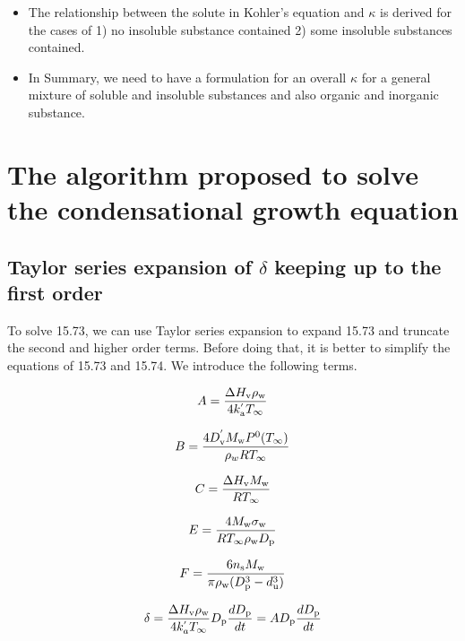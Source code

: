 \documentclass[12pt]{article}
\begin{document}
{\begin{itemize}
\item The relationship between the solute in Kohler's equation and $\kappa$ is derived for the cases of 1) no insoluble substance contained 2) some insoluble substances contained.  

\item In Summary, we need to have a formulation for an overall $\kappa$ for a general mixture of soluble and insoluble substances and also organic and inorganic substance. 
 
\end{itemize}

\section{The algorithm proposed to solve the condensational growth equation}
\subsection{Taylor series expansion of $\delta$ keeping up to the first order}

To solve 15.73, we can use Taylor series expansion to expand 15.73 and truncate the second and higher order terms. Before doing that, it is better to simplify the equations of 15.73 and 15.74. We introduce the following terms.

\begin{equation}
A=\frac{\Delta H_{\rm v} \rho_{\rm w}}{4 k_{\rm a}^{'} T_{\infty}}
\end{equation}

\begin{equation}
B=\frac{4 D_{\rm v}^{'} M_{\rm w} P^{\rm 0}(T_{\infty})}{\rho_w R T_{\infty}}
\end{equation}

\begin{equation}
C=\frac{\Delta H_{\rm v} M_{\rm w}}{R T_{\infty}}
\end{equation}

\begin{equation}
E=\frac{4 M_{\rm w}\sigma_{\rm w}}{R T_{\infty} \rho_{\rm w} D_{\rm p}}
\end{equation}

\begin{equation}
F=\frac{6 n_{\rm s} M_{\rm w}}{\pi \rho_{\rm w} (D_{\rm p}^{3}-d_{\rm u}^{3})}
\end{equation}

\begin{equation}\label{eqn:23}
\delta=\frac{\Delta H_{\rm v} \rho_{\rm w}}{4 k_a^{'} T_{\infty}} D_{\rm p} \frac{d D_{\rm p}}{dt}=A D_{\rm p} \frac{d D_{\rm p}}{dt}
\end{equation}

}
\end{document}
